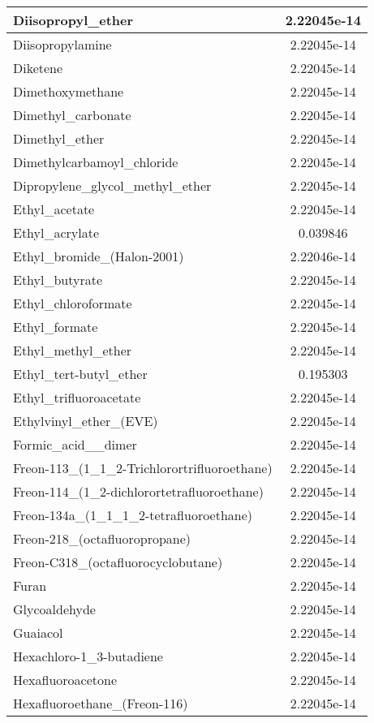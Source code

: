 \begin{longtable}{|l|c|}
Diisopropyl\_ether 	& 2.22045e-14\\ \hline
Diisopropylamine 	& 2.22045e-14\\ \hline
Diketene 	& 2.22045e-14\\ \hline
Dimethoxymethane 	& 2.22045e-14\\ \hline
Dimethyl\_carbonate 	& 2.22045e-14\\ \hline
Dimethyl\_ether 	& 2.22045e-14\\ \hline
Dimethylcarbamoyl\_chloride 	& 2.22045e-14\\ \hline
Dipropylene\_glycol\_methyl\_ether 	& 2.22045e-14\\ \hline
Ethyl\_acetate 	& 2.22045e-14\\ \hline
Ethyl\_acrylate 	& 0.039846\\ \hline
Ethyl\_bromide\_(Halon-2001) 	& 2.22046e-14\\ \hline
Ethyl\_butyrate 	& 2.22045e-14\\ \hline
Ethyl\_chloroformate 	& 2.22045e-14\\ \hline
Ethyl\_formate 	& 2.22045e-14\\ \hline
Ethyl\_methyl\_ether 	& 2.22045e-14\\ \hline
Ethyl\_tert-butyl\_ether 	& 0.195303\\ \hline
Ethyl\_trifluoroacetate 	& 2.22045e-14\\ \hline
Ethylvinyl\_ether\_(EVE) 	& 2.22045e-14\\ \hline
Formic\_acid\_\_dimer 	& 2.22045e-14\\ \hline
Freon-113\_(1\_1\_2-Trichlorortrifluoroethane) 	& 2.22045e-14\\ \hline
Freon-114\_(1\_2-dichlorortetrafluoroethane) 	& 2.22045e-14\\ \hline
Freon-134a\_(1\_1\_1\_2-tetrafluoroethane) 	& 2.22045e-14\\ \hline
Freon-218\_(octafluoropropane) 	& 2.22045e-14\\ \hline
Freon-C318\_(octafluorocyclobutane) 	& 2.22045e-14\\ \hline
Furan 	& 2.22045e-14\\ \hline
Glycoaldehyde 	& 2.22045e-14\\ \hline
Guaiacol 	& 2.22045e-14\\ \hline
Hexachloro-1\_3-butadiene 	& 2.22045e-14\\ \hline
Hexafluoroacetone 	& 2.22045e-14\\ \hline
Hexafluoroethane\_(Freon-116) 	& 2.22045e-14\\ \hline

\end{longtable}
